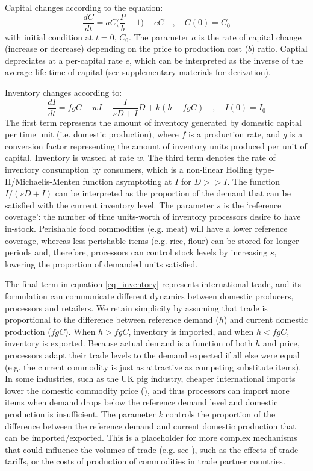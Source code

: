 \documentclass[12pt]{article}
\begin{document}
Capital changes according to the equation:
%
\begin{equation}
  \frac{dC}{dt} = a C \Big(\frac{P}{b} - 1\Big) - e C \quad, \quad C(0) = C_0
  \label{eq_capital}
\end{equation}
%
with initial condition at $t = 0$, $C_0$. The parameter $a$ is the rate of capital change (increase or decrease) depending on the price to production cost ($b$) ratio. Captial depreciates at a per-capital rate $e$, which can be interpreted as the inverse of the average life-time of capital (see supplementary materials for derivation).

Inventory changes according to:
%
\begin{equation}
  \frac{dI}{dt} = f g C - w I - \frac{I}{sD + I} D + k (h - f g C) \quad, \quad I(0) = I_0
  \label{eq_inventory}
\end{equation}
%
The first term represents the amount of inventory generated by domestic capital per time unit (i.e. domestic production), where $f$ is a production rate, and $g$ is a conversion factor representing the amount of inventory units produced per unit of capital. Inventory is wasted at rate $w$. The third term denotes the rate of inventory consumption by consumers, which is a non-linear Holling type-II/Michaelis-Menten function asymptoting at $I$ for $D >> I$. The function $I/(sD + I)$ can be interpreted as the proportion of the demand that can be satisfied with the current inventory level. The parameter $s$ is the `reference coverage': the number of time units-worth of inventory processors desire to have in-stock. Perishable food commodities (e.g. meat) will have a lower reference coverage, whereas less perishable items (e.g. rice, flour) can be stored for longer periods and, therefore, processors can control stock levels by increasing $s$, lowering the proportion of demanded units satisfied.

The final term in equation \ref{eq_inventory} represents international trade, and its formulation can communicate different dynamics between domestic producers, processors and retailers. We retain simplicity by assuming that trade is proportional to the difference between reference demand ($h$) and current domestic production ($f g C$). When $h > f g C$, inventory is imported, and when $h < f g C$, inventory is exported. Because actual demand is a function of both $h$ and price, processors adapt their trade levels to the demand expected if all else were equal (e.g. the current commodity is just as attractive as competing substitute items). In some industries, such as the UK pig industry, cheaper international imports lower the domestic commodity price (\cite{AHDBeuroexhange2015}), and thus processors can import more items when demand drops below the reference demand level and domestic production is insufficient. The parameter $k$ controls the proportion of the difference between the reference demand and current domestic production that can be imported/exported. This is a placeholder for more complex mechanisms that could influence the volumes of trade (e.g. see \cite{tu2019}), such as the effects of trade tariffs, or the costs of production of commodities in trade partner countries.
\end{document}
